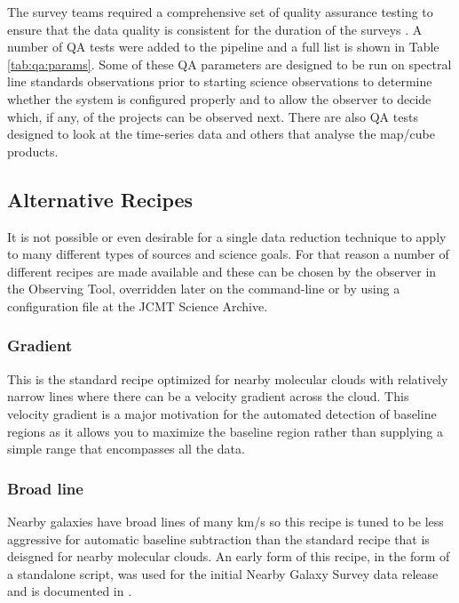 \documentclass[final,authoryear,5p,times,twocolumn]{elsarticle}
\begin{document}
The survey teams required a comprehensive set of quality assurance
testing to ensure that the data quality is consistent for the duration
of the surveys \citep{2008JCMTLSQA}. A number of QA tests were added
to the pipeline and a full list is shown in Table
\ref{tab:qa:params}. Some of these QA parameters are designed to be
run on spectral line standards observations prior to starting science
observations to determine whether the system is configured properly
and to allow the observer to decide which, if any, of the projects can
be observed next. There are also QA tests designed to look at the
time-series data and others that analyse the map/cube products.

\subsection{Alternative Recipes}

It is not possible or even desirable for a single data reduction
technique to apply to many different types of sources and science
goals. For that reason a number of different recipes are made
available and these can be chosen by the observer in the Observing
Tool, overridden later on the command-line or by using a
configuration file at the JCMT Science Archive.

\subsubsection{Gradient}

This is the standard recipe optimized for nearby molecular clouds with
relatively narrow lines where there can be a velocity gradient across
the cloud. This velocity gradient is a major motivation for the
automated detection of baseline regions as it allows you to maximize
the baseline region rather than supplying a simple range that
encompasses all the data.

\subsubsection{Broad line}

Nearby galaxies have broad lines of many km/s so this recipe is tuned
to be less aggressive for automatic baseline subtraction than the
standard recipe that is deisgned for nearby molecular clouds. An early
form of this recipe, in the form of a standalone script, was used for
the initial Nearby Galaxy Survey data release and is documented in
\citet{2010ApJ...714..571W}.
\end{document}
